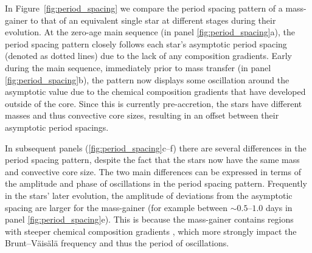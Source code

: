 \documentclass[desactivate]{aa}
\begin{document}
In Figure~\ref{fig:period_spacing} we compare the period spacing pattern of a mass-gainer to that of an equivalent single star at different stages during their evolution. At the zero-age main sequence (in panel \ref{fig:period_spacing}a), the period spacing pattern closely follows each star's asymptotic period spacing (denoted as dotted lines) due to the lack of any composition gradients. Early during the main sequence, immediately prior to mass transfer (in panel \ref{fig:period_spacing}b), the pattern now displays some oscillation around the asymptotic value due to the chemical composition gradients that have developed outside of the core. Since this is currently pre-accretion, the stars have different masses and thus convective core sizes, resulting in an offset between their asymptotic period spacings.

In subsequent panels (\ref{fig:period_spacing}c--f) there are several differences in the period spacing pattern, despite the fact that the stars now have the same mass and convective core size. The two main differences can be expressed in terms of the amplitude and phase of oscillations in the period spacing pattern. Frequently in the stars' later evolution, the amplitude of deviations from the asymptotic spacing are larger for the mass-gainer (for example between ${\sim}0.5$--$1.0$ days in panel \ref{fig:period_spacing}e). This is because the mass-gainer contains regions with steeper chemical composition gradients \citep{Renzo+2023}, which more strongly impact the Brunt–Väisälä frequency and thus the period of oscillations.
\end{document}
